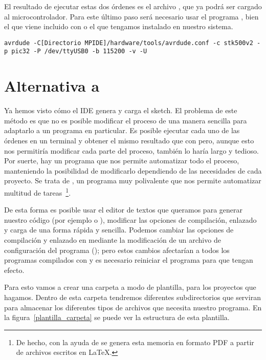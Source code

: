 El resultado de ejecutar estas dos órdenes es el archivo , que ya podrá ser cargado al microcontrolador.
Para este último paso será necesario usar el programa , bien el que viene incluido con  o el que tengamos instalado en nuestro sistema.
\begin{lstlisting}[breaklines=true]
avrdude -C[Directorio MPIDE]/hardware/tools/avrdude.conf -c stk500v2 -p pic32 -P /dev/ttyUSB0 -b 115200 -v -U
\end{lstlisting}

\section{Alternativa a }

Ya hemos visto cómo el IDE genera y carga el sketch. El problema de este método es que no es posible modificar el proceso de una manera sencilla para adaptarlo a un programa en particular. Es posible ejecutar cada uno de las órdenes en un terminal y obtener el mismo resultado que con  pero, aunque esto nos permitiría modificar cada parte del proceso, también lo haría largo y tedioso. Por suerte, hay un programa que nos permite automatizar todo el proceso, manteniendo la posibilidad de modificarlo dependiendo de las necesidades de cada proyecto. Se trata de , un programa muy polivalente que nos permite automatizar multitud de tareas~\footnote{De hecho, con la ayuda de  se genera esta memoria en formato PDF a partir de archivos escritos en \LaTeX.}.

De esta forma es posible usar el editor de textos que queramos para generar nuestro código (por ejemplo  o ), modificar las opciones de compilación, enlazado y carga de una forma rápida y sencilla. Podemos cambiar las opciones de compilación y enlazado en  mediante la modificación de un archivo de configuración del programa (); pero estos cambios afectarían a todos los programas compilados con  y es necesario reiniciar el programa para que tengan efecto.

Para esto vamos a crear una carpeta a modo de plantilla, para los proyectos que hagamos. Dentro de esta carpeta tendremos diferentes subdirectorios que serviran para almacenar los diferentes tipos de archivos que necesita nuestro programa. En la figura~\ref{plantilla_carpeta} se puede ver la estructura de esta plantilla.

